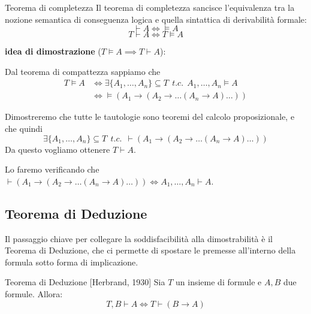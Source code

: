 \documentclass[a4paper,11pt]{report}
\begin{document}
\begin{thmframe}{Teorema di completezza}{}
    Il teorema di completezza sancisce l'equivalenza tra la nozione semantica di conseguenza logica e quella sintattica di derivabilità formale:
    \[ \vdash A \iff \vDash A \]
    \[ T \vdash A \iff T \vDash A \]
\end{thmframe}

\begin{gframe}{}
    \textbf{idea di dimostrazione} (\( T\vDash A \implies T\vdash A \)):

    Dal teorema di compattezza sappiamo che
    \begin{align*}
        T\vDash A &\iff \exists \{A_1, \dots, A_n\} \subseteq T \ \ t.c. \ \ A_1, \dots, A_n \vDash A \\
                  &\iff \vDash (A_1 \to (A_2 \to \dots (A_n \to A)\dots))
    \end{align*}

    Dimostreremo che tutte le tautologie sono teoremi del calcolo proposizionale, e che quindi 
    \[\exists \{A_1, \dots, A_n\} \subseteq T \ \ t.c. \ \  \vdash (A_1 \to (A_2 \to \dots (A_n \to A)\dots)) \]
    Da questo vogliamo ottenere \( T\vdash A \). 

    Lo faremo verificando che \( \vdash (A_1 \to (A_2 \to \dots (A_n \to A)\dots)) \iff  A_1, \dots, A_n \vdash A \).

\end{gframe}

\subsection{Teorema di Deduzione}

Il passaggio chiave per collegare la soddisfacibilità alla dimostrabilità è il Teorema di Deduzione, che ci permette di spostare le premesse all'interno della formula sotto forma di implicazione.

\begin{thmframe}{Teorema di Deduzione [Herbrand, 1930]}{}
    Sia \( T \) un insieme di formule e \( A, B \) due formule. Allora:
    \[ T, B \vdash A \iff T \vdash (B \to A) \]
\end{thmframe}
\end{document}

